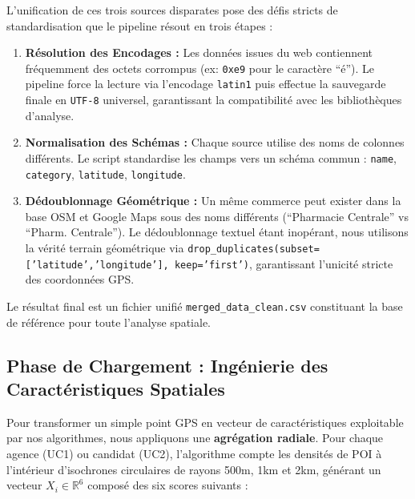 L'unification de ces trois sources disparates pose des défis stricts de standardisation que le pipeline résout en trois étapes :

\begin{enumerate}
    \item \textbf{Résolution des Encodages :} Les données issues du web contiennent fréquemment des octets corrompus (ex: \texttt{0xe9} pour le caractère ``é''). Le pipeline force la lecture via l'encodage \texttt{latin1} puis effectue la sauvegarde finale en \texttt{UTF-8} universel, garantissant la compatibilité avec les bibliothèques d'analyse.
    \item \textbf{Normalisation des Schémas :} Chaque source utilise des noms de colonnes différents. Le script standardise les champs vers un schéma commun : \texttt{name}, \texttt{category}, \texttt{latitude}, \texttt{longitude}.
    \item \textbf{Dédoublonnage Géométrique :} Un même commerce peut exister dans la base OSM et Google Maps sous des noms différents (``Pharmacie Centrale'' vs ``Pharm. Centrale''). Le dédoublonnage textuel étant inopérant, nous utilisons la vérité terrain géométrique via \texttt{drop\_duplicates(subset=['latitude','longitude'], keep='first')}, garantissant l'unicité stricte des coordonnées GPS.
\end{enumerate}

Le résultat final est un fichier unifié \texttt{merged\_data\_clean.csv} constituant la base de référence pour toute l'analyse spatiale.

\subsection{Phase de Chargement : Ingénierie des Caractéristiques Spatiales}

Pour transformer un simple point GPS en vecteur de caractéristiques exploitable par nos algorithmes, nous appliquons une \textbf{agrégation radiale}. Pour chaque agence (UC1) ou candidat (UC2), l'algorithme compte les densités de POI à l'intérieur d'isochrones circulaires de rayons 500m, 1km et 2km, générant un vecteur $X_i \in \mathbb{R}^6$ composé des six scores suivants :

